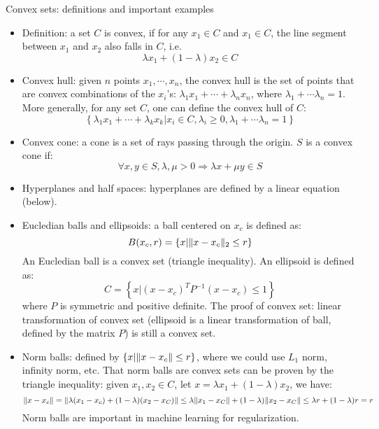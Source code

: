 \documentclass{report}
\begin{document}
Convex sets: definitions and important examples
\begin{itemize}
\item Definition: a set $C$ is convex, if for any $x_1 \in C$ and $x_1 \in C$, the line segment between $x_1$ and $x_2$ also falls in $C$, i.e.
\begin{equation}
\lambda x_1 + (1 - \lambda) x_2 \in C	
\end{equation}

\item Convex hull: given $n$ points $x_1, \cdots, x_n$, the convex hull is the set of points that are convex combinations of the $x_i$'s: $\lambda_1 x_1 + \cdots + \lambda_n x_n$, where $\lambda_1 + \cdots \lambda_n = 1$. More generally, for any set $C$, one can define the convex hull of $C$: 
\begin{equation}
\left\{ \lambda_1 x_1 + \cdots + \lambda_k x_k | x_i \in C, \lambda_i \geq 0, \lambda_1 + \cdots \lambda_n = 1 \right\}	
\end{equation}

\item Convex cone: a cone is a set of rays passing through the origin. $S$ is a convex cone if: 
\begin{equation}
\forall x, y \in S, \lambda, \mu > 0 \Rightarrow \lambda x + \mu y \in S	
\end{equation}

\item Hyperplanes and half spaces: hyperplanes are defined by a linear equation (below). 

\item Eucledian balls and ellipsoids: a ball centered on $x_c$ is defined as: 
\begin{equation}
B(x_c, r)	= \left\{x | \lVert x - x_c\rVert_2 \leq r \right\}
\end{equation}
An Eucledian ball is a convex set (triangle inequality). An ellipsoid is defined as: 
\begin{equation}
C = \left\{x | (x - x_c)^T P^{-1} (x-x_c) \leq 1 \right\}
\end{equation}
where $P$ is symmetric and positive definite. The proof of convex set: linear transformation of convex set (ellipsoid is a linear transformation of ball, defined by the matrix $P$) is still a convex set. 

\item Norm balls: defined by $\left\{x | \lVert x - x_c\rVert \leq r \right\}$, where we could use $L_1$ norm, infinity norm, etc. That norm balls are convex sets can be proven by the triangle inequality: given $x_1, x_2 \in C$, let $x = \lambda x_1 + (1 - \lambda) x_2$, we have: 
\begin{equation}
\lVert x - x_c\rVert = \lVert\lambda (x_1 - x_c) + (1 - \lambda) (x_2 - x_C)\rVert \leq \lambda \lVert x_1 - x_C\rVert + (1 - \lambda) \lVert x_2 - x_C\rVert \leq \lambda r + (1 - \lambda) r = r	
\end{equation}
Norm balls are important in machine learning for regularization. 


\end{itemize}
\end{document}
